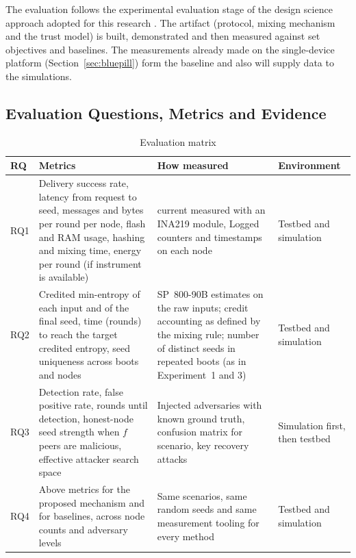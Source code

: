 \documentclass[a4paper, 12pt]{article}
\begin{document}
The evaluation follows the experimental evaluation stage of the design science approach adopted for this research \citep{hevner2004design,peffers2007dsrm}. The artifact (protocol, mixing mechanism and the trust model) is built, demonstrated and then measured against set objectives and baselines. The measurements already made on the single-device platform (Section~\ref{sec:bluepill}) form the baseline and also will supply data to the simulations.
 
\subsection{Evaluation Questions, Metrics and Evidence}
  
\begin{table}[htbp]
\centering
\small
\caption{Evaluation matrix}
\label{tab:ev_matrix}
\begin{tabularx}{\textwidth}{@{}p{}p{}Xp{}@{}}
\toprule
\textbf{RQ} & \textbf{Metrics} & \textbf{How measured} & \textbf{Environment} \\
\midrule
RQ1 &
Delivery success rate, latency from request to seed, messages and bytes per round per node, flash and RAM usage, hashing and mixing time, energy per round (if instrument is available) &
current measured with an INA219 module, Logged counters and timestamps
on each node
 & 
Testbed and simulation \\
\addlinespace
RQ2 &
Credited min-entropy of each input and of the final seed, time (rounds) to reach the target credited entropy, seed uniqueness across boots and nodes &
SP~800-90B estimates on the raw inputs; credit accounting as defined by the mixing rule; number of distinct seeds in repeated boots (as in Experiment~1 and 3) &
Testbed and simulation \\
\addlinespace
RQ3  &
Detection rate, false positive rate, rounds until detection, honest-node seed strength when $f$ peers are malicious, effective attacker search space &
Injected adversaries with known ground truth, confusion matrix for scenario, key recovery attacks &
Simulation first, then testbed \\
\addlinespace
RQ4  &
Above metrics for the proposed mechanism and for baselines, across node counts and adversary levels &
Same scenarios, same random seeds and same measurement tooling for every method &
Testbed and simulation \\
\bottomrule
\end{tabularx}
\end{table}
 
\end{document}
